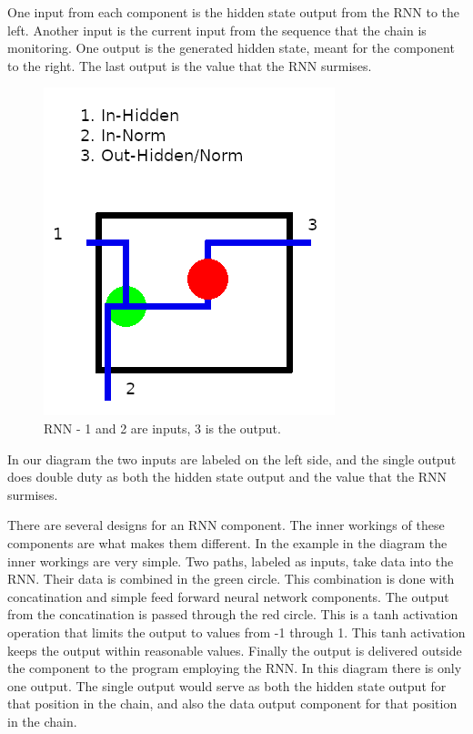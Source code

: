 One input from each component is the hidden state output from the RNN to the left. Another input is the current input from the sequence that the chain is monitoring. One output is the generated hidden state, meant for the component to the right. The last output is the value that the RNN surmises. 

\begin{figure}[H]
	
	\includegraphics[scale=1.0]{diagram-rnn}
	
	\caption[Recurrent Neural Network]{RNN - 1 and 2 are inputs, 3 is the output.}
	
\end{figure}

In our diagram the two inputs are labeled on the left side, and the single output does double duty as both the hidden state output and the value that the RNN surmises.

There are several designs for an RNN component. The inner workings of these components are what makes them different. In the example in the diagram the inner workings are very simple. Two paths, labeled as inputs, take data into the RNN. Their data is combined in the green circle. This combination is done with concatination and simple feed forward neural network components. The output from the concatination is passed through the red circle. This is a tanh activation operation that limits the output to values from -1 through 1. This tanh activation keeps the output within reasonable values. Finally the output is delivered outside the component to the program employing the RNN. In this diagram there is only one output. The single output would serve as both the hidden state output for that position in the chain, and also the data output component for that position in the chain.



